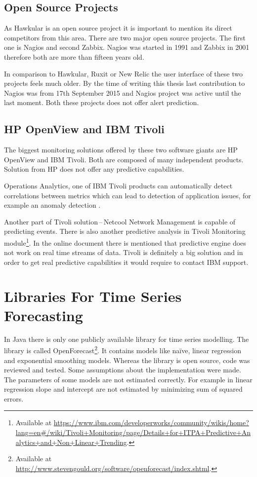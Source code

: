         \subsection{Open Source Projects}
        As Hawkular is an open source project it is important to mention its direct competitors from this area.
        There are two major open source projects. The first one is Nagios and second Zabbix. Nagios was started in
        1991 and Zabbix in 2001 therefore both are more than fifteen years old.

        In comparison to Hawkular, Ruxit or New Relic the user interface of these two projects feels much older.
        By the time of writing this thesis last contribution to Nagios was from 17th September 2015 and Nagios
        project was active until the last moment. Both these projects does not offer alert prediction.

        \subsection{HP OpenView and IBM Tivoli}
        The biggest monitoring solutions offered by these two software giants are HP OpenView and IBM Tivoli. Both are
        composed of many independent products. Solution from HP does not offer any predictive capabilities.

        Operations Analytics, one of IBM Tivoli products can automatically detect correlations between
        metrics which can lead to detection of application issues, for example an anomaly detection
        \cite{tivoli-predictive-insights}.

        Another part of Tivoli solution\,--\,Netcool Network Management is capable
        of predicting events. There is also another predictive analysis in Tivoli Monitoring
        module\footnote{Available at
        \url{https://www.ibm.com/developerworks/community/wikis/home?lang=en\#/wiki/Tivoli+Monitoring/page/Details+for+ITPA+Predictive+Analytics+and+Non+Linear+Trending}.}.
        In the online document there is mentioned that predictive engine does not work on real time streams of data.
        Tivoli is definitely a big solution and in order to get real predictive capabilities it would require to
        contact IBM support.

    \section{Libraries For Time Series Forecasting} \label{sec:libraries-for-ts}
    In Java there is only one publicly available library for time series modelling. The library is called
    OpenForecast\footnote{Available at \url{http://www.stevengould.org/software/openforecast/index.shtml}.}. It contains
    models like na\"{i}ve, linear regression and exponential smoothing models. Whereas the library is open source, code
    was reviewed and tested. Some assumptions about the implementation were made. The parameters of some models are
    not estimated correctly. For example in linear regression slope and intercept are not estimated by minimizing
    sum of squared errors.


